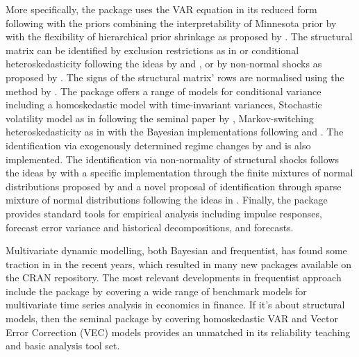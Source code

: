\documentclass[
  nojss]{jss}
\begin{document}
More specifically, the package uses the VAR equation in its reduced form
following \cite{Banbura2010} \citep[see also][]{Wozniak2016} with the
priors combining the interpretability of Minnesota prior by
\cite{Doan1984} with the flexibility of hierarchical prior shrinkage as
proposed by \cite{Giannone2015}. The structural matrix can be identified
by exclusion restrictions as in \cite{WaggonerZha2003} or conditional
heteroskedasticity following the ideas by \cite{Rigobon03} and
\cite{LLM2010}, or by non-normal shocks as proposed by \cite{Lanne2010}.
The signs of the structural matrix' rows are normalised using the method
by \cite{WaggonerZha2003norm}. The package offers a range of models for
conditional variance including a homoskedastic model with time-invariant
variances, Stochastic volatility model as in \cite{LSUW2022} following
the seminal paper by \cite{Primiceri2005}, Markov-switching
heteroskedasticity as in \cite{LLM2010} with the Bayesian
implementations following \cite{Wozniak2015} and \cite{LW2017}. The
identification via exogenously determined regime changes by
\cite{Rigobon03} and \cite{Lanne2008} is also implemented. The
identification via non-normality of structural shocks follows the ideas
by \cite{lanne2017} with a specific implementation through the finite
mixtures of normal distributions proposed by \cite{Lanne2010} and a
novel proposal of identification through sparse mixture of normal
distributions following the ideas in \cite{malsiner2016model}. Finally,
the package provides standard tools for empirical analysis including
impulse responses, forecast error variance and historical
decompositions, and forecasts.

Multivariate dynamic modelling, both Bayesian and frequentist, has found
some traction in  in the recent years, which resulted in
many new packages available on the CRAN repository. The most relevant
developments in frequentist approach include the package  by
\cite{MTS} covering a wide range of benchmark models for multivariate
time series analysis in economics in finance. If it's about structural
models, then the seminal package  by \cite{vars} covering
homoskedastic VAR and Vector Error Correction (VEC) models provides an
unmatched in its reliability teaching and basic analysis tool set.
\end{document}
